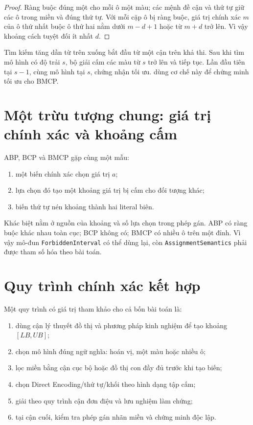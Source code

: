 \begin{proof}
Ràng buộc đúng một cho mỗi ô một màu; các mệnh đề cận và thứ tự giữ các ô trong
miền và đúng thứ tự. Với mỗi cặp ô bị ràng buộc, giá trị chính xác \(m\) của ô
thứ nhất buộc ô thứ hai nằm dưới \(m-d+1\) hoặc từ \(m+d\) trở lên. Vì vậy
khoảng cách tuyệt đối ít nhất \(d\).
\end{proof}

Tìm kiếm tăng dần từ trên xuống bắt đầu từ một cận trên khả thi. Sau khi tìm
mô hình có độ trải \(s\), bộ giải cấm các màu từ \(s\) trở lên và tiếp tục.
Lần \UNSAT đầu tiên tại \(s-1\), cùng mô hình tại \(s\), chứng nhận tối ưu.
\textcite{nguyen2026bmcp} dùng cơ chế này để chứng minh tối ưu cho BMCP.

\section{Một trừu tượng chung: giá trị chính xác và khoảng cấm}

ABP, BCP và BMCP gặp cùng một mẫu:
\begin{enumerate}
  \item một biến chính xác chọn giá trị \(a\);
  \item lựa chọn đó tạo một khoảng giá trị bị cấm cho đối tượng khác;
  \item biến thứ tự nén khoảng thành hai literal biên.
\end{enumerate}
Khác biệt nằm ở nguồn của khoảng và số lựa chọn trong phép gán. ABP có ràng
buộc khác nhau toàn cục; BCP không có; BMCP có nhiều ô trên một đỉnh. Vì vậy
mô-đun \texttt{ForbiddenInterval} có thể dùng lại, còn
\texttt{AssignmentSemantics} phải được tham số hóa theo bài toán.

\section{Quy trình chính xác kết hợp}

Một quy trình có giá trị tham khảo cho cả bốn bài toán là:
\begin{enumerate}
  \item dùng cận lý thuyết đồ thị và phương pháp kinh nghiệm để tạo khoảng
        \([LB,UB]\);
  \item chọn mô hình đúng ngữ nghĩa: hoán vị, một màu hoặc nhiều ô;
  \item lọc miền bằng cận cục bộ hoặc đồ thị con đầy đủ trước khi tạo biến;
  \item chọn Direct Encoding/thứ tự/khối theo hình dạng tập cấm;
  \item giải theo quy trình cận đơn điệu và lưu nghiệm làm chứng;
  \item tại cận cuối, kiểm tra phép gán nhãn miền và chứng minh \UNSAT độc lập.
\end{enumerate}

